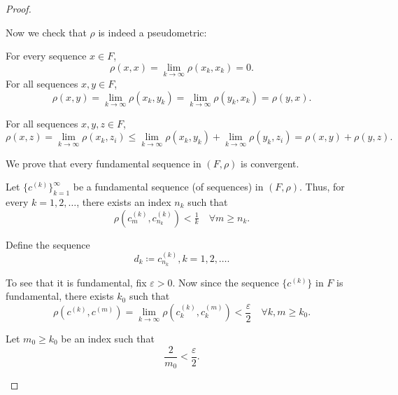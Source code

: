 \begin{proof}
\begin{defenum}
    Now we check that \( \rho \) is indeed a pseudometric:
    \begin{description}
       For every sequence \( x \in F \),
      \begin{equation*}
        \rho(x, x) = \lim_{k \to \infty} \rho(x_k, x_k) = 0.
      \end{equation*}
       For all sequences \( x, y \in F \),
      \begin{equation*}
        \rho(x, y) = \lim_{k \to \infty} \rho(x_k, y_k) = \lim_{k \to \infty} \rho(y_k, x_k) = \rho(y, x).
      \end{equation*}

       For all sequences \( x, y, z \in F \),
      \begin{equation*}
        \rho(x, z) = \lim_{k \to \infty} \rho(x_k, z_i) \leq \lim_{k \to \infty} \rho(x_k, y_k) + \lim_{k \to \infty} \rho(y_k, z_i) = \rho(x, y) + \rho(y, z).
      \end{equation*}
    \end{description}

     We prove that every fundamental sequence in \( (F, \rho) \) is convergent.

    Let \( \{ c^{(k)} \}_{k=1}^\infty \) be a fundamental sequence (of sequences) in \( (F, \rho) \). Thus, for every \( k = 1, 2, \ldots \), there exists an index \( n_k \) such that
    \begin{equation*}
      \rho(c_m^{(k)}, c_{n_k}^{(k)}) < \tfrac 1 k \quad\forall m \geq n_k.
    \end{equation*}

    Define the sequence
    \begin{equation*}
      d_k \coloneqq c_{n_k}^{(k)}, k = 1, 2, \ldots.
    \end{equation*}

    To see that it is fundamental, fix \( \varepsilon > 0 \). Now since the sequence \( \{ c^{(k)} \} \) in \( F \) is fundamental, there exists \( k_0 \) such that
    \begin{equation*}
      \rho(c^{(k)}, c^{(m)}) = \lim_{k \to \infty} \rho(c_k^{(k)}, c_k^{(m)}) < \frac \varepsilon 2 \quad\forall k, m \geq k_0.
    \end{equation*}

    Let \( m_0 \geq k_0 \) be an index such that
    \begin{equation*}
      \frac 2 {m_0} < \frac \varepsilon 2.
    \end{equation*}


\end{defenum}
\end{proof}
